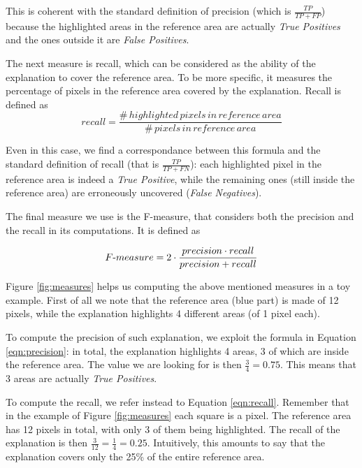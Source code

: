 \documentclass[12pt, twoside, a4paper]{report}
\begin{document}
This is coherent with the standard definition of precision (which is $\frac{TP}{TP+FP}$) because the highlighted areas in the reference area are actually \textit{True Positives} and the ones outside it are \textit{False Positives}.

The next measure is recall, which can be considered as the ability of the explanation to cover the reference area. To be more specific, it measures the percentage of pixels in the reference area covered by the explanation. Recall is defined as
\begin{equation}
recall = 
\frac
	{\#\,highlighted\,pixels\,in\,reference\,area}
	{\#\,pixels\,in\,reference\,area}
     \label{eqn:recall}
\end{equation}

Even in this case, we find a correspondance between this formula and the standard definition of recall (that is $\frac{TP}{TP+FN}$): each highlighted pixel in the reference area is indeed a \textit{True Positive}, while the remaining ones (still inside the reference area) are erroneously uncovered (\textit{False Negatives}).

The final measure we use is the F-measure, that considers both the precision and the recall in its computations. It is defined as 

\begin{equation}
F\textnormal{-}measure = 
	2 \cdot \frac
	    {precision \cdot recall}
        {precision + recall} 
\label{eqn:fmeasure}
\end{equation}

Figure \ref{fig:measures} helps us computing the above mentioned measures in a toy example. First of all we note that the reference area (blue part) is made of 12 pixels, while the explanation highlights 4 different areas (of 1 pixel each). 

To compute the precision of such explanation, we exploit the formula in Equation \ref{eqn:precision}: in total, the explanation highlights 4 areas, 3 of which are inside the reference area. The value we are looking for is then $\frac{3}{4} = 0.75$. This means that 3 areas are actually \textit{True Positives}. 

To compute the recall, we refer instead to Equation	\ref{eqn:recall}. Remember that in the example of Figure 	\ref{fig:measures} each square is a pixel. The reference area has 12 pixels in total, with only 3 of them being highlighted. The recall of the explanation is then $\frac{3}{12} = \frac{1}{4} = 0.25$. Intuitively, this amounts to say that the explanation covers only the 25\% of the entire reference area.
\end{document}
